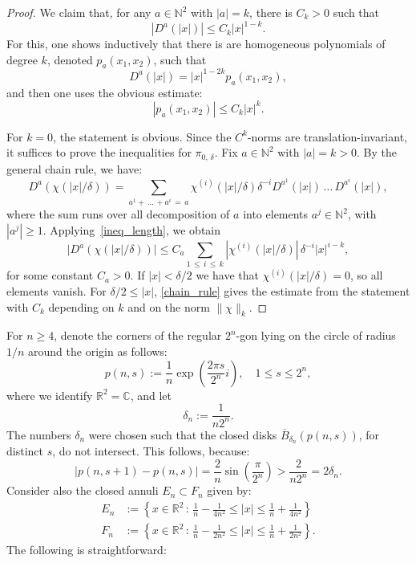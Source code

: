 \documentclass[10pt]{amsart}
\theoremstyle{definition}
\newcommand{\R}{\mathbb{R}}
\newcommand{\N}{\mathbb{N}}
\newcommand{\norm}[1]{\|#1\|}
\newcommand{\bbC}{\mathbb{C}}
\begin{document}
\begin{proof}
We claim that, for any $a\in \N^2$ with $|a|=k$, there is $C_k>0$ such that
\begin{equation}\label{ineq_length}
\left|D^a(|x|)\right|\leq C_k|x|^{1-k}.
\end{equation}
For this, one shows inductively that there is are homogeneous polynomials of degree $k$, denoted $p_a(x_1,x_2)$, such that
\[
D^a(|x|)=|x|^{1-2k}p_a(x_1,x_2),
\]
and then one uses the obvious estimate:
\[
|p_a(x_1,x_2)|\leq C_k|x|^k.
\]

For $k=0$, the statement is obvious. Since the $C^k$-norms are translation-invariant, it suffices to prove the inequalities for $\pi_{0,\,\delta}$. Fix $a\in \N^2$ with $|a|=k>0$. By the general chain rule, we have:
\[
D^a\left(\chi(|x|/\delta)\right)=\sum_{a^1+\,\ldots\,+a^i\,=\,a}\chi^{(i)}\left(|x|/\delta\right)\delta^{-i} D^{a^1}(|x|)\,\ldots\,D^{a^i}(|x|),
\]
where the sum runs over all decomposition of $a$ into elements $a^j\in \N^2$, with $|a^j|\geq 1$. Applying~\eqref{ineq_length}, we obtain
\begin{equation}\label{chain_rule}
\big|D^a\left(\chi(|x|/\delta)\right)\big|\leq C_a\sum_{1\,\leq\,i\,\leq\,k}\left|\chi^{(i)}(|x|/\delta)\right|\,\delta^{-i} |x|^{i-k},
\end{equation}
for some constant $C_a>0$. If $|x|<\delta/2$ we have that $\chi^{(i)}(|x|/\delta)=0$, so all elements vanish. For $\delta/2\leq |x|$, \eqref{chain_rule} gives the estimate from the statement with $C_k$ depending on $k$ and on the norm $\norm{\chi}_k$.
\end{proof}

For $n\geq 4$, denote the corners of the regular $2^n$-gon lying on the circle of radius $1/n$ around the origin as follows:
\[
p(n,s):=\frac{1}{n}\exp\left(\frac{2 \pi s }{2^{n}}i\right), \quad 1\leq s\leq 2^n,
\]
where we identify $\R^2=\bbC$, and let
\[
\delta_n:=\frac{1}{n 2^n}.
\]
The numbers $\delta_n$ were chosen such that the closed disks $\overline{B}_{\delta_n}(p(n,s))$, for distinct $s$, do not intersect. This follows, because:
\[
\big|p(n,s+1)-p(n,s)\big|=\frac{2}{n}\sin\left(\frac{\pi}{2^n}\right)>\frac{2}{n2^n}=2\delta_n.
\]
Consider also the closed annuli $E_n\subset F_n$ given by:
\begin{align*}
E_n&:=\left\{x\in \R^2\, :\, \frac{1}{n}-\frac{1}{4n^2}\leq |x|\leq \frac{1}{n}+\frac{1}{4n^2}\right\}\\
F_n&:=\left\{x\in \R^2\, :\, \frac{1}{n}-\frac{1}{2n^2}\leq |x|\leq \frac{1}{n}+\frac{1}{2n^2}\right\}.
\end{align*}
The following is straightforward:
\end{document}
